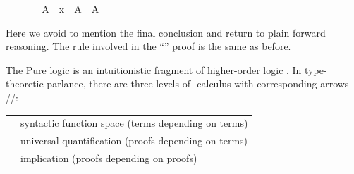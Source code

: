 \begin{isabellebody}
\ \ \ \ \isamarkupfalse%
\ \isamarkupfalse%
\ A\ \ {}x\ {}\ A{}\ \ {}A\ {}\ {}{}\ \isamarkupfalse%
%
\endisatagproof
{\isafoldproof}%
%
\isadelimproof
%
\endisadelimproof
%
\begin{isamarkuptext}%
\noindent Here we avoid to mention the final conclusion 
  and return to plain forward reasoning.  The rule involved in the
  ``\hyperlink{command.ddot}{\mbox{}}'' proof is the same as before.%
\end{isamarkuptext}%
\isamarkuptrue%
%
\isamarkuptrue%
%
\begin{isamarkuptext}%
The Pure logic \cite{paulson-found,paulson700} is an intuitionistic
  fragment of higher-order logic \cite{church40}.  In type-theoretic
  parlance, there are three levels of -calculus with
  corresponding arrows //:

  \medskip
  \begin{tabular}{ll}
  \isa{{\isaliteral{22}{\isachardoublequote}}{\isaliteral{5C3C616C7068613E}{\isasymalpha}}\ {\isaliteral{5C3C52696768746172726F773E}{\isasymRightarrow}}\ {\isaliteral{5C3C626574613E}{\isasymbeta}}{\isaliteral{22}{\isachardoublequote}}} & syntactic function space (terms depending on terms) \\
  \isa{{\isaliteral{22}{\isachardoublequote}}{\isaliteral{5C3C416E643E}{\isasymAnd}}x{\isaliteral{2E}{\isachardot}}\ B{\isaliteral{28}{\isacharparenleft}}x{\isaliteral{29}{\isacharparenright}}{\isaliteral{22}{\isachardoublequote}}} & universal quantification (proofs depending on terms) \\
  \isa{{\isaliteral{22}{\isachardoublequote}}A\ {\isaliteral{5C3C4C6F6E6772696768746172726F773E}{\isasymLongrightarrow}}\ B{\isaliteral{22}{\isachardoublequote}}} & implication (proofs depending on proofs) \\
  \end{tabular}
  \medskip


\end{isamarkuptext}
\end{isabellebody}
